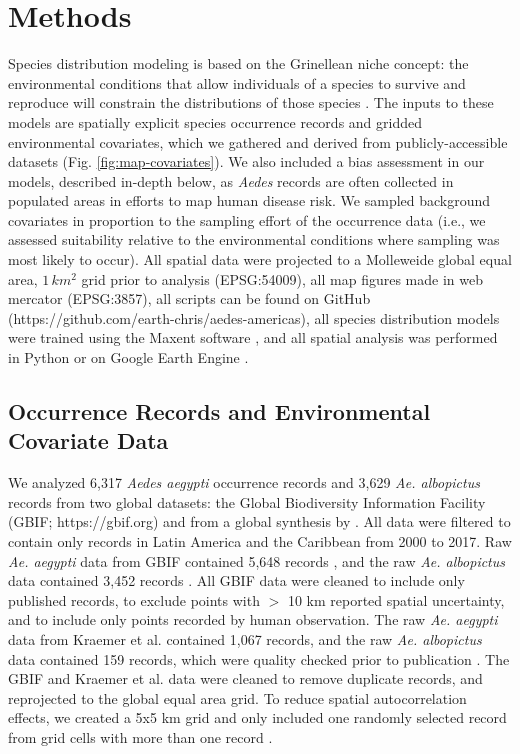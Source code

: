\section{Methods}

Species distribution modeling is based on the Grinellean niche concept: the environmental conditions that allow individuals of a species to survive and reproduce will constrain the distributions of those species \cite{Grinnell1917-aa, Wiens2009-sb}. The inputs to these models are spatially explicit species occurrence records and gridded environmental covariates, which we gathered and derived from publicly-accessible datasets (Fig. \ref{fig:map-covariates}). We also included a bias assessment in our models, described in-depth below, as \textit{Aedes} records are often collected in populated areas in efforts to map human disease risk. We sampled background covariates in proportion to the sampling effort of the occurrence data (i.e., we assessed suitability relative to the environmental conditions where sampling was most likely to occur). All spatial data were projected to a Molleweide global equal area, $1\, km^2$ grid prior to analysis (EPSG:54009), all map figures made in web mercator (EPSG:3857), all scripts can be found on GitHub (https://github.com/earth-chris/aedes-americas), all species distribution models were trained using the Maxent software \cite{Steven_J_Phillips_Miroslav_Dudik_Robert_E_Schapire_undated-nv}, and all spatial analysis was performed in Python or on Google Earth Engine \cite{Gorelick2017-nx}.

\subsection{Occurrence Records and Environmental Covariate Data}

We analyzed 6,317 \textit{Aedes aegypti} occurrence records and 3,629 \textit{Ae. albopictus} records from two global datasets: the Global Biodiversity Information Facility (GBIF; https://gbif.org) and from a global synthesis by \cite{Kraemer2015-sm}. All data were filtered to contain only records in Latin America and the Caribbean from 2000 to 2017. Raw \textit{Ae. aegypti} data from GBIF contained 5,648 records \cite{Gbif2018-ae}, and the raw \textit{Ae. albopictus} data contained 3,452 records \cite{Gbif2018-aa}. All GBIF data were cleaned to include only published records, to exclude points with $>$ 10 km reported spatial uncertainty, and to include only points recorded by human observation. The raw \textit{Ae. aegypti} data from Kraemer et al. contained 1,067 records, and the raw \textit{Ae. albopictus} data contained 159 records, which were quality checked prior to publication \cite{Kraemer2015-sm}. The GBIF and Kraemer et al. data were cleaned to remove duplicate records, and reprojected to the global equal area grid. To reduce spatial autocorrelation effects, we created a 5x5 km grid and only included one randomly selected record from grid cells with more than one record \cite{Segurado2006-gy, Hawkins2012-gu}.

